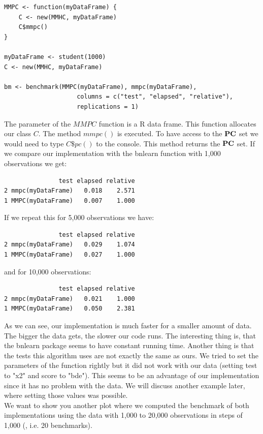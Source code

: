  	\begin{verbatim}
MMPC <- function(myDataFrame) {
    C <- new(MMHC, myDataFrame)
    C$mmpc()
}

myDataFrame <- student(1000)
C <- new(MMHC, myDataFrame)

bm <- benchmark(MMPC(myDataFrame), mmpc(myDataFrame),
                    columns = c("test", "elapsed", "relative"),
                    replications = 1)
 	\end{verbatim}

 	The parameter of the $MMPC$ function is a R data frame. This function allocates our class $C$. The method $mmpc()$ is executed. To have access to the ${\textbf{PC}}$ set we would need to type $C\$pc()$ to the console. This method returns the ${\textbf{PC}}$ set. If we compare our implementation with the bnlearn function with 1,000 observations we get:
	\begin{verbatim}
               test elapsed relative
2 mmpc(myDataFrame)   0.018    2.571
1 MMPC(myDataFrame)   0.007    1.000
	\end{verbatim}

	If we repeat this for 5,000 observations we have:

	\begin{verbatim}
               test elapsed relative
2 mmpc(myDataFrame)   0.029    1.074
1 MMPC(myDataFrame)   0.027    1.000
	\end{verbatim}

	and for 10,000 observations:

	\begin{verbatim}
               test elapsed relative
2 mmpc(myDataFrame)   0.021    1.000
1 MMPC(myDataFrame)   0.050    2.381
	\end{verbatim}

	As we can see, our implementation is much faster for a smaller amount of data. The bigger the data gets, the slower our code runs. The interesting thing is, that the bnlearn package seems to have constant running time. Another thing is that the tests this algorithm uses are not exactly the same as ours. We tried to set the parameters of the function rightly but it did not work with our data (setting test to "x2" and score to "bde"). This seems to be an advantage of our implementation since it has no problem with the data. We will discuss another example later, where setting those values was possible.\\
	We want to show you another plot where we computed the benchmark of both implementations using the data with 1,000 to 20,000 observations in steps of 1,000 (, i.e. 20 benchmarks).

